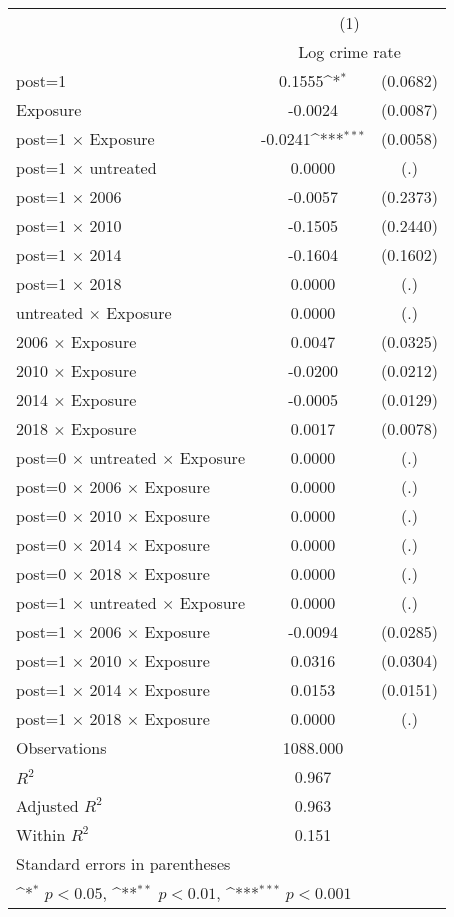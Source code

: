 {
\def\sym#1{\ifmmode^{#1}\else\(^{#1}\)\fi}
\begin{tabular}{l*{1}{cc}}
\toprule
                &\multicolumn{2}{c}{(1)}     \\
                &\multicolumn{2}{c}{Log crime rate}\\
\midrule
post=1          &   0.1555\sym{*}  & (0.0682)\\
Exposure        &  -0.0024         & (0.0087)\\
post=1 $\times$ Exposure&  -0.0241\sym{***}& (0.0058)\\
post=1 $\times$ untreated&   0.0000         &      (.)\\
post=1 $\times$ 2006&  -0.0057         & (0.2373)\\
post=1 $\times$ 2010&  -0.1505         & (0.2440)\\
post=1 $\times$ 2014&  -0.1604         & (0.1602)\\
post=1 $\times$ 2018&   0.0000         &      (.)\\
untreated $\times$ Exposure&   0.0000         &      (.)\\
2006 $\times$ Exposure&   0.0047         & (0.0325)\\
2010 $\times$ Exposure&  -0.0200         & (0.0212)\\
2014 $\times$ Exposure&  -0.0005         & (0.0129)\\
2018 $\times$ Exposure&   0.0017         & (0.0078)\\
post=0 $\times$ untreated $\times$ Exposure&   0.0000         &      (.)\\
post=0 $\times$ 2006 $\times$ Exposure&   0.0000         &      (.)\\
post=0 $\times$ 2010 $\times$ Exposure&   0.0000         &      (.)\\
post=0 $\times$ 2014 $\times$ Exposure&   0.0000         &      (.)\\
post=0 $\times$ 2018 $\times$ Exposure&   0.0000         &      (.)\\
post=1 $\times$ untreated $\times$ Exposure&   0.0000         &      (.)\\
post=1 $\times$ 2006 $\times$ Exposure&  -0.0094         & (0.0285)\\
post=1 $\times$ 2010 $\times$ Exposure&   0.0316         & (0.0304)\\
post=1 $\times$ 2014 $\times$ Exposure&   0.0153         & (0.0151)\\
post=1 $\times$ 2018 $\times$ Exposure&   0.0000         &      (.)\\
\midrule
Observations    & 1088.000         &         \\
\(R^{2}\)       &    0.967         &         \\
Adjusted \(R^{2}\)&    0.963         &         \\
Within \(R^{2}\)&    0.151         &         \\
\bottomrule
\multicolumn{3}{l}{\footnotesize Standard errors in parentheses}\\
\multicolumn{3}{l}{\footnotesize \sym{*} \(p<0.05\), \sym{**} \(p<0.01\), \sym{***} \(p<0.001\)}\\
\end{tabular}
}

